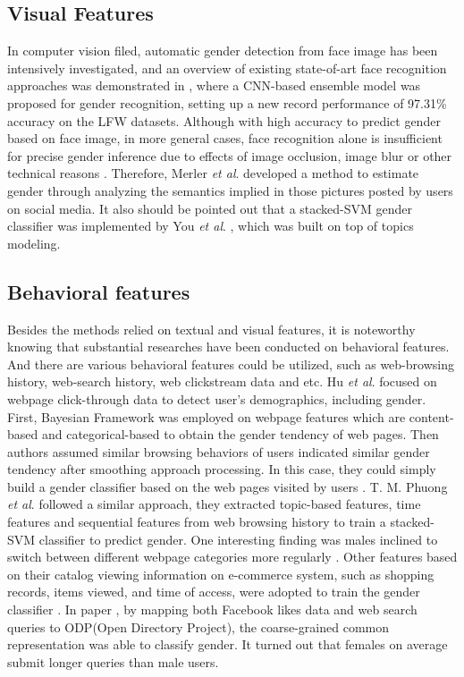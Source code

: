 \documentclass[runningheads]{llncs}
\begin{document}
	\subsection{Visual Features}
	
	In computer vision filed, automatic gender detection from face image has been intensively investigated, and an overview of existing state-of-art face recognition approaches was demonstrated in \cite{antipov2016minimalistic}, where a CNN-based ensemble model was proposed for gender recognition, setting up a new record performance of 97.31\% accuracy on the LFW datasets. Although with high accuracy to predict gender based on face image, in more general cases, face recognition alone is insufficient for precise gender inference due to effects of image occlusion, image blur or other technical reasons \cite{merler2015you}. Therefore, Merler \textit{et al}. developed a method to estimate gender through analyzing the semantics implied in those pictures posted by users on social media. It also should be pointed out that a stacked-SVM gender classifier was implemented by You \textit{et al}. \cite{you2014eyes}, which was built on top of topics modeling.
	
	\subsection{Behavioral features}
	
	Besides the methods relied on textual and visual features, it is noteworthy knowing that substantial researches have been conducted on behavioral features. And there are various behavioral features could be utilized, such as web-browsing history, web-search history, web clickstream data and etc. Hu \textit{et al}. focused on webpage click-through data to detect user’s demographics, including gender. First, Bayesian Framework was employed on webpage features which are content-based and categorical-based to obtain the gender tendency of web pages. Then authors assumed similar browsing behaviors of users indicated similar gender tendency after smoothing approach processing. In this case, they could simply build a gender classifier based on the web pages visited by users \cite{hu2007demographic}. T. M. Phuong \textit{et al}. followed a similar approach, they extracted topic-based features, time features and sequential features from web browsing history to train a stacked-SVM classifier to predict gender. One interesting finding was males inclined to switch between different webpage categories more regularly \cite{phuong2014gender}. Other features based on their catalog viewing information on e-commerce system, such as shopping records, items viewed, and time of access, were adopted to train the gender classifier \cite{duong2016customer}. In paper \cite{bi2013inferring}, by mapping both Facebook likes data and web search queries to ODP(Open Directory Project), the coarse-grained common representation was able to classify gender. It turned out that females on average submit longer queries than male users. 
	
\end{document}
